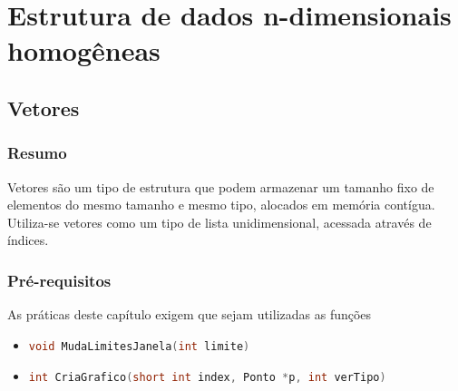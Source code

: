 
\part[Estrutura de dados n-dimensionais homogêneas]
{Estrutura de dados n-dimensionais homogêneas}


\chapter[Vetores]
{Vetores}



\section*{Resumo}

Vetores são um tipo de estrutura que podem armazenar um tamanho fixo de elementos do mesmo tamanho e mesmo tipo, alocados em memória contígua. Utiliza-se vetores como um tipo de lista unidimensional, acessada através de índices.


%
%







\section*{Pré-requisitos}

As práticas deste capítulo exigem que sejam utilizadas as funções
\begin{itemize}
  \item 
    \begin{lstlisting}[language=C++]
    void MudaLimitesJanela(int limite)
    \end{lstlisting}

  \item
    \begin{lstlisting}[language=C++]
    int CriaGrafico(short int index, Ponto *p, int verTipo)
    \end{lstlisting}
\end{itemize}


